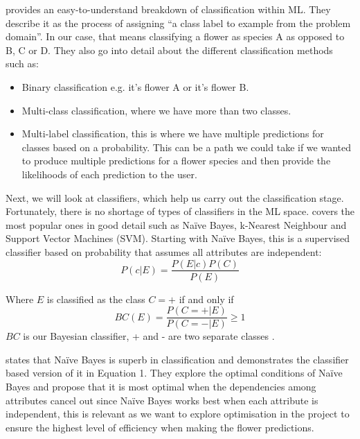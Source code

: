 \documentclass[12pt,a4paper]{report}
\begin{document}
\citet{brownlee2020} provides an easy-to-understand breakdown of classification within ML. They describe it 
as the process of assigning “a class label to example from the problem domain”. In our case, that means classifying a 
flower as species A as opposed to B, C or D. They also go into detail about the different classification methods such 
as:
\begin{itemize}
    \item Binary classification e.g. it's flower A or it's flower B.
    \item Multi-class classification, where we have more than two classes.
    \item Multi-label classification, this is where we have multiple predictions for classes based on a probability. 
    This can be a path we could take if we wanted to produce multiple predictions for a flower species and then provide 
    the likelihoods of each prediction to the user.
\end{itemize}
Next, we will look at classifiers, which help us carry out the classification stage. Fortunately, there is no shortage 
of types of classifiers in the ML space. \citet{MohammedMohssen2017Ml:a}covers the most popular ones in 
good detail such as Naïve Bayes, k-Nearest Neighbour and Support Vector Machines (SVM). Starting with Naïve Bayes, this 
is a supervised classifier based on probability that assumes all attributes are independent:
\begin{equation}
P(c|E) = \frac{P(E|c)P(C)}{P(E)}
\end{equation}

Where \(E\) is classified as the class \(C = +\) if and only if
\[BC(E) = \frac{P(C = +|E)}{P(C = -|E)} \geq 1\]
\(BC\) is our Bayesian classifier, + and - are two separate classes \citep{zhang2004optimality}.

\par

\citet{zhang2004optimality} states that Naïve Bayes is superb in classification and demonstrates the
classifier based version of it in Equation 1. They explore the optimal conditions of Naïve Bayes and propose
that it is most optimal when the dependencies among attributes cancel out since Naïve Bayes works best when each 
attribute is independent, this is relevant as we want to explore optimisation in the project to ensure the highest 
level of efficiency when making the flower predictions.

\par
\end{document}
